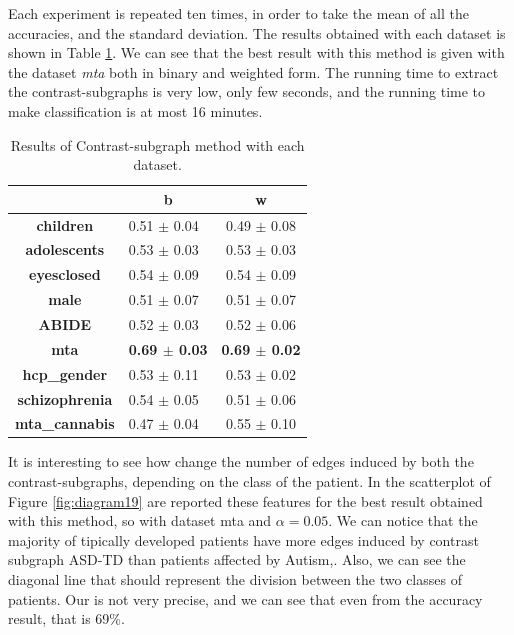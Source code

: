 Each experiment is repeated ten times, in order to take the mean of all the accuracies, and the standard deviation. The results obtained with each dataset is shown in Table \ref{tab:c-s}. We can see that the best result with this method is given with the dataset \textit{mta} both in binary and weighted form. The running time to extract the contrast-subgraphs is very low, only few seconds, and the running time to make classification is at most 16 minutes.
\vspace{0.5cm}
\begin{table}
	\centering
	\begin{tabular}{c|l|c} 
		\toprule
		& \multicolumn{1}{c|}{b} & w                \\ 
		\midrule
		\textbf{children}      & 0.51 $\pm$ 0.04        & 0.49 $\pm$ 0.08  \\
		\textbf{adolescents}   & 0.53 $\pm$ 0.03        & 0.53 $\pm$ 0.03  \\
		\textbf{eyesclosed}    & 0.54 $\pm$ 0.09        & 0.54 $\pm$ 0.09  \\
		\textbf{male}          & 0.51 $\pm$ 0.07        & 0.51 $\pm$ 0.07  \\
		\textbf{ABIDE}         & 0.52 $\pm$ 0.03        & 0.52 $\pm$ 0.06  \\
		\textbf{mta}           & \textbf{0.69 $\pm$ 0.03}        & \textbf{0.69 $\pm$ 0.02}  \\
		\textbf{hcp\_gender}   & 0.53 $\pm$ 0.11        & 0.53 $\pm$ 0.02  \\
		\textbf{schizophrenia} & 0.54 $\pm$ 0.05        & 0.51 $\pm$ 0.06  \\
		\textbf{mta\_cannabis} & 0.47 $\pm$ 0.04        & 0.55 $\pm$ 0.10 
	\end{tabular}
	\caption{Results of Contrast-subgraph method with each dataset.}
	\label{tab:c-s}
\end{table}

It is interesting to see how change the number of edges induced by both the contrast-subgraphs, depending on the class of the patient. In the scatterplot of Figure \ref{fig:diagram19} are reported these features for the best result obtained with this method, so with dataset mta and $ \alpha = 0.05 $. We can notice that the majority of tipically developed patients have more edges induced by contrast subgraph ASD-TD than patients affected by Autism,. Also, we can see the diagonal line that should represent the division between the two classes of patients. Our is not very precise, and we can see that even from the accuracy result, that is 69\%.

